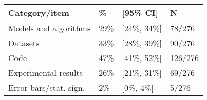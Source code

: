 \begin{tabular}{llll}
\hline
Category/item & \% & [95\% CI]  & N \\
\hline
Models and algorithms & 29\% & [24\%, 34\%] & 78/276\\
Datasets & 33\% & [28\%, 39\%] & 90/276\\
Code & 47\% & [41\%, 52\%] & 126/276\\
Experimental results & 26\% & [21\%, 31\%] & 69/276\\
Error bars/stat. sign.& 2\% & [0\%, 4\%] & 5/276\\
\hline
\end{tabular}
